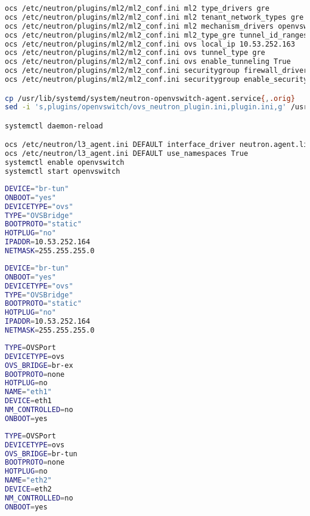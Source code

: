 \documentclass[11pt,letterpaper,oneside]{book}
\begin{document}
\begin{lstlisting}[caption={Neutron virneupaw001},language=bash]
ocs /etc/neutron/plugins/ml2/ml2_conf.ini ml2 type_drivers gre
ocs /etc/neutron/plugins/ml2/ml2_conf.ini ml2 tenant_network_types gre
ocs /etc/neutron/plugins/ml2/ml2_conf.ini ml2 mechanism_drivers openvswitch
ocs /etc/neutron/plugins/ml2/ml2_conf.ini ml2_type_gre tunnel_id_ranges 1:1000
ocs /etc/neutron/plugins/ml2/ml2_conf.ini ovs local_ip 10.53.252.163
ocs /etc/neutron/plugins/ml2/ml2_conf.ini ovs tunnel_type gre
ocs /etc/neutron/plugins/ml2/ml2_conf.ini ovs enable_tunneling True
ocs /etc/neutron/plugins/ml2/ml2_conf.ini securitygroup firewall_driver neutron.agent.linux.iptables_firewall.OVSHybridIptablesFirewallDriver
ocs /etc/neutron/plugins/ml2/ml2_conf.ini securitygroup enable_security_group True

cp /usr/lib/systemd/system/neutron-openvswitch-agent.service{,.orig}
sed -i 's,plugins/openvswitch/ovs_neutron_plugin.ini,plugin.ini,g' /usr/lib/systemd/system/neutron-openvswitch-agent.service

systemctl daemon-reload

ocs /etc/neutron/l3_agent.ini DEFAULT interface_driver neutron.agent.linux.interface.OVSInterfaceDriver
ocs /etc/neutron/l3_agent.ini DEFAULT use_namespaces True
systemctl enable openvswitch
systemctl start openvswitch

\end{lstlisting}

\begin{lstlisting}[caption={br-tun},language=bash]
DEVICE="br-tun"
ONBOOT="yes"
DEVICETYPE="ovs"
TYPE="OVSBridge"
BOOTPROTO="static"
HOTPLUG="no"
IPADDR=10.53.252.164
NETMASK=255.255.255.0
\end{lstlisting}
\begin{lstlisting}[caption={br-ex},language=bash]
DEVICE="br-tun"
ONBOOT="yes"
DEVICETYPE="ovs"
TYPE="OVSBridge"
BOOTPROTO="static"
HOTPLUG="no"
IPADDR=10.53.252.164
NETMASK=255.255.255.0
\end{lstlisting}
\begin{lstlisting}[caption={},language=bash]
TYPE=OVSPort
DEVICETYPE=ovs
OVS_BRIDGE=br-ex
BOOTPROTO=none
HOTPLUG=no
NAME="eth1"
DEVICE=eth1
NM_CONTROLLED=no
ONBOOT=yes
\end{lstlisting}

\begin{lstlisting}[caption={},language=bash]
TYPE=OVSPort
DEVICETYPE=ovs
OVS_BRIDGE=br-tun
BOOTPROTO=none
HOTPLUG=no
NAME="eth2"
DEVICE=eth2
NM_CONTROLLED=no
ONBOOT=yes

\end{lstlisting}
\end{document}
